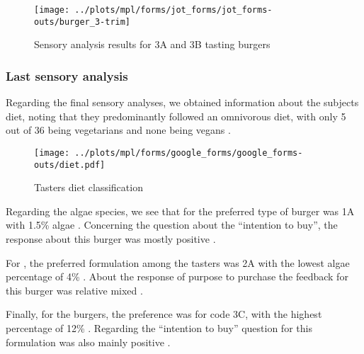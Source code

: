 \begin{figure}[H]
\scriptsize
\centering
	\begin{minipage}[b]{0.475\textwidth}%
	\centering%
	\end{minipage}%
\hspace*{0.05\textwidth}%
	\begin{minipage}[b]{0.4162\textwidth}%
	\centering%
		\texttt{[image: ../plots/mpl/forms/jot\_forms/jot\_forms-outs/burger\_3-trim]}%
	\caption{Sensory analysis results for  3A and 3B tasting burgers\label{subfig:sens_analysis-palmaria}}%
	\end{minipage}%
\end{figure}

\subsubsection{Last sensory analysis}
Regarding the final sensory analyses, we obtained information about the subjects diet, noting that they predominantly followed an omnivorous diet, with only \num{5} out of \num{36} being vegetarians and none being vegans .

\begin{figure}[H]
\centering
\texttt{[image: ../plots/mpl/forms/google\_forms/google\_forms-outs/diet.pdf]}
\caption{Tasters diet classification}
\label{fig:diet-pieplot}
\end{figure}


Regarding the algae species, we see that for  the preferred type of burger was 1A with \num{1.5}\% algae 
. Concerning the question about the “intention to buy”, the response about this burger was mostly positive .

For , the preferred formulation among the tasters was 2A with the lowest algae percentage of \num{4}\% . About the response of purpose to purchase the feedback for this burger was relative mixed .

Finally, for the  burgers, the preference was for code 3C, with the highest percentage of \num{12}\% . Regarding the “intention to buy” question for this formulation was also mainly positive .


